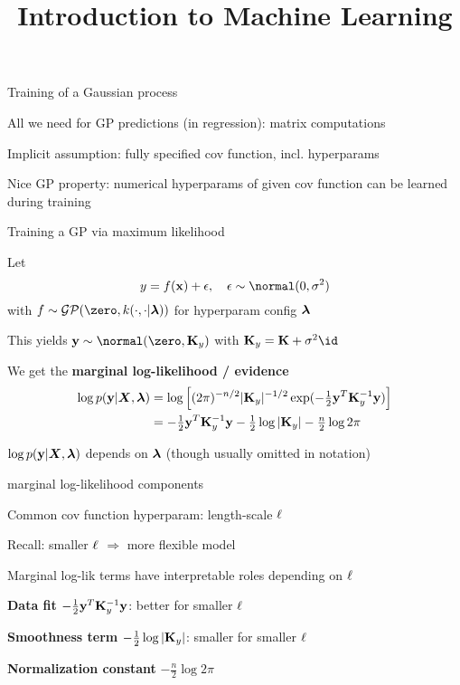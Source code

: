 \documentclass[11pt,compress,t,notes=noshow, xcolor=table]{beamer}
\title{Introduction to Machine Learning}
\begin{document}

\begin{framei}[sep=L]{Training of a Gaussian process}
\item All we need for GP predictions (in regression): matrix computations
\item Implicit assumption: fully specified cov function, incl. hyperparams
\item Nice GP property: numerical hyperparams of given cov function can be learned during training
\end{framei}

\begin{framei}[sep=L]{Training a GP via maximum likelihood}
\item Let $$y = \fx + \epsilon, \quad \epsilon \sim \normal(0, \sigma^2)$$
with $f \sim \mathcal{GP}(\zero, k(\cdot, \cdot | \lamv))$ for hyperparam config $\bm{\lambda}$
\item This yields $\yv \sim \normal(\zero, \Kmat_y )$ with  $\Kmat_y = \Kmat + \sigma^2 \id$
\item We get the \textbf{marginal log-likelihood / evidence}
\begin{eqnarray*}
\log p(\mathbf{y} | \bm{X}, \bm{\lambda}) &= \log \left[(2 \pi )^{-n / 2} |\mathbf{K}_y|^{-1 / 2} \exp(- \tfrac{1}{2} \mathbf{y}^T \mathbf{K}_y^{-1} \mathbf{y}) \right] \\
&= - \tfrac{1}{2} \mathbf{y}^T \mathbf{K}_y^{-1} \mathbf{y} - \tfrac{1}{2} \log | \mathbf{K}_y | - \tfrac{n}{2} \log 2 \pi
\end{eqnarray*}
\item $\log p(\mathbf{y} | \bm{X}, \bm{\lambda})$ depends on $\bm{\lambda}$ (though   usually omitted in notation)
\end{framei}

\begin{framei}[sep=L]{marginal log-likelihood components}
\item Common cov function hyperparam: length-scale $\ell$
\item Recall: smaller $\ell$ $\Rightarrow$ more flexible model
\item Marginal log-lik terms have interpretable roles depending on $\ell$
\item \textbf{Data fit} $- \tfrac{1}{2} \mathbf{y}^T \mathbf{K}_y^{-1} \mathbf{y}$: better for smaller $\ell$
\item \textbf{Smoothness term} $- \tfrac{1}{2} \log | \mathbf{K}_y |$: smaller for smaller  $\ell$
\item \textbf{Normalization constant} $- \tfrac{n}{2} \log 2 \pi$
\end{framei}
\end{document}
